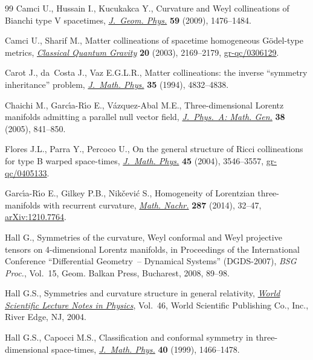 \documentclass[pdftex]{sigma}
\numberwithin{equation}{section}
\begin{document}
\begin{thebibliography}{99}
Camci U., Hussain I., Kucukakca Y., Curvature and {W}eyl collineations of
 {B}ianchi type {V} spacetimes, \href{http://dx.doi.org/10.1016/j.geomphys.2009.07.008}{\textit{J.~Geom. Phys.}} \textbf{59} (2009),
 1476--1484.

Camci U., Sharif M., Matter collineations of spacetime homogeneous
 {G}\"odel-type metrics, \href{http://dx.doi.org/10.1088/0264-9381/20/11/316}{\textit{Classical Quantum Gravity}} \textbf{20}
 (2003), 2169--2179, \href{http://arxiv.org/abs/gr-qc/0306129}{gr-qc/0306129}.

Carot J., da~Costa J., Vaz E.G.L.R., Matter collineations: the inverse
 ``symmetry inheritance'' problem, \href{http://dx.doi.org/10.1063/1.530816}{\textit{J.~Math. Phys.}} \textbf{35} (1994),
 4832--4838.

Chaichi M., Garc{\'{\i}}a-R{\'{\i}}o E., V{\'a}zquez-Abal M.E.,
 Three-dimensional {L}orentz manifolds admitting a parallel null vector f\/ield,
 \href{http://dx.doi.org/10.1088/0305-4470/38/4/005}{\textit{J.~Phys.~A: Math. Gen.}} \textbf{38} (2005), 841--850.

Flores J.L., Parra Y., Percoco U., On the general structure of {R}icci
 collineations for type {B} warped space-times, \href{http://dx.doi.org/10.1063/1.1775875}{\textit{J.~Math. Phys.}}
 \textbf{45} (2004), 3546--3557, \href{http://arxiv.org/abs/gr-qc/0405133}{gr-qc/0405133}.

Garc{\'{\i}}a-R{\'{\i}}o E., Gilkey P.B., Nik{\v{c}}evi{\'c} S., Homogeneity of
 {L}orentzian three-manifolds with recurrent curvature, \href{http://dx.doi.org/10.1002/mana.201200302}{\textit{Math. Nachr.}}
 \textbf{287} (2014), 32--47, \href{http://arxiv.org/abs/1210.7764}{arXiv:1210.7764}.

Hall G., Symmetries of the curvature, {W}eyl conformal and {W}eyl projective
 tensors on 4-dimensional {L}orentz manifolds, in Proceedings of the
 {I}nternational {C}onference ``{D}if\/ferential {G}eometry~-- {D}ynamical
 {S}ystems'' ({DGDS}-2007), \textit{BSG Proc.}, Vol.~15, Geom. Balkan Press,
 Bucharest, 2008, 89--98.

Hall G.S., Symmetries and curvature structure in general relativity,
 \href{http://dx.doi.org/10.1142/1729}{\textit{World Scientific Lecture Notes in Physics}}, Vol.~46, World Scientif\/ic
 Publishing Co., Inc., River Edge, NJ, 2004.

Hall G.S., Capocci M.S., Classif\/ication and conformal symmetry in
 three-dimensional space-times, \href{http://dx.doi.org/10.1063/1.532815}{\textit{J.~Math. Phys.}} \textbf{40} (1999),
 1466--1478.


\end{thebibliography}
\end{document}
